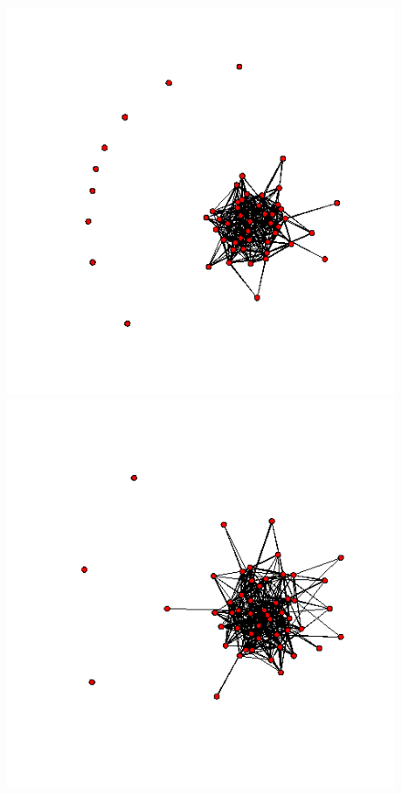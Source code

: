 \documentclass[a4paper, 11pt]{report}
\theoremstyle{definition}
\begin{document}
\begin{figure}[h]
    \begin{center}
    \includegraphics[scale=0.26]{pictures/m2_19_nework.png}
    \includegraphics[scale=0.26]{pictures/w2_19_nework.png}

\end{center}
\end{figure}
\end{document}
